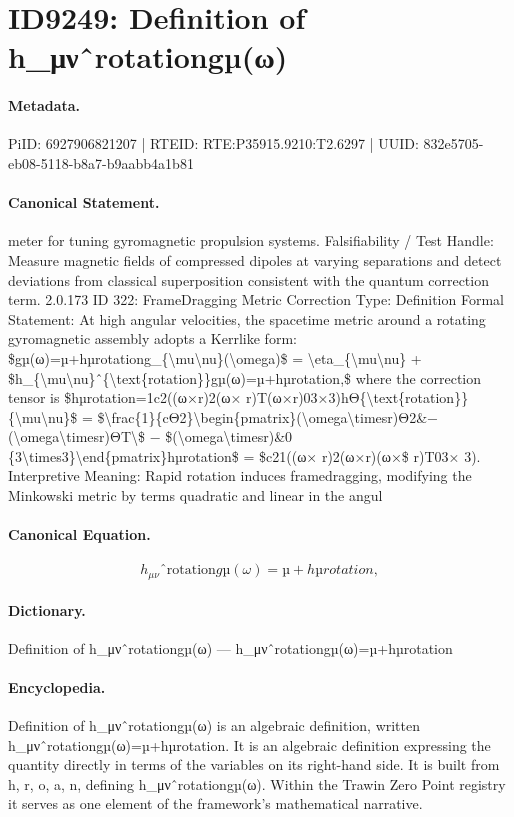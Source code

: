 \section*{ID9249: Definition of h\_μνˆrotationgµ(ω)}
\paragraph{Metadata.}
PiID: 6927906821207 | RTEID: RTE:P35915.9210:T2.6297 | UUID: 832e5705-eb08-5118-b8a7-b9aabb4a1b81

\paragraph{Canonical Statement.}
meter for tuning gyromagnetic propulsion systems. Falsifiability / Test Handle: Measure magnetic fields of compressed dipoles at varying separations and detect deviations from classical superposition consistent with the quantum correction term. 2.0.173 ID 322: FrameDragging Metric Correction Type: Definition Formal Statement: At high angular velocities, the spacetime metric around a rotating gyromagnetic assembly adopts a Kerrlike form: \$gµ(ω)=µ+hµrotationg\_\{\textbackslash{}mu\textbackslash{}nu\}(\textbackslash{}omega)\$ = \textbackslash{}eta\_\{\textbackslash{}mu\textbackslash{}nu\} + \$h\_\{\textbackslash{}mu\textbackslash{}nu\}ˆ\{\textbackslash{}text\{rotation\}\}gµ(ω)=µ+hµrotation,\$ where the correction tensor is \$hµrotation=1c2((ω×r)2(ω× r)T(ω×r)03×3)hΘ\{\textbackslash{}text\{rotation\}\} \{\textbackslash{}mu\textbackslash{}nu\}\$ = \$\textbackslash{}frac\{1\}\{cΘ2\}\textbackslash{}begin\{pmatrix\}(\textbackslash{}omega\textbackslash{}timesr)Θ2\&− (\textbackslash{}omega\textbackslash{}timesr)ΘT\textbackslash{}\$ − \$(\textbackslash{}omega\textbackslash{}timesr)\&0 \{3\textbackslash{}times3\}\textbackslash{}end\{pmatrix\}hµrotation\$ = \$c21((ω× r)2(ω×r)(ω×\$ r)T03× 3). Interpretive Meaning: Rapid rotation induces framedragging, modifying the Minkowski metric by terms quadratic and linear in the angul

\paragraph{Canonical Equation.}
\[
h_{\mu\nu}ˆ{\text{rotation}}gµ(ω)=µ+hµrotation,
\]

\paragraph{Dictionary.}
Definition of h\_μνˆrotationgµ(ω) — h\_μνˆrotationgµ(ω)=µ+hµrotation

\paragraph{Encyclopedia.}
Definition of h\_μνˆrotationgµ(ω) is an algebraic definition, written h\_μνˆrotationgµ(ω)=µ+hµrotation. It is an algebraic definition expressing the quantity directly in terms of the variables on its right-hand side. It is built from h, r, o, a, n, defining h\_μνˆrotationgµ(ω). Within the Trawin Zero Point registry it serves as one element of the framework's mathematical narrative.
